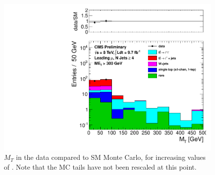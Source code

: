 \begin{figure}[hbt]
\begin{center}
        \includegraphics[width=0.5\linewidth]{plots/mt_met300_muo.pdf}

    \caption{$M_T$ in the data compared to SM Monte Carlo, for
      increasing values of \met. Note that the MC tails have not
      been rescaled at this point.
\label{fig:mtsig2}
}  
      \end{center}
\end{figure}


